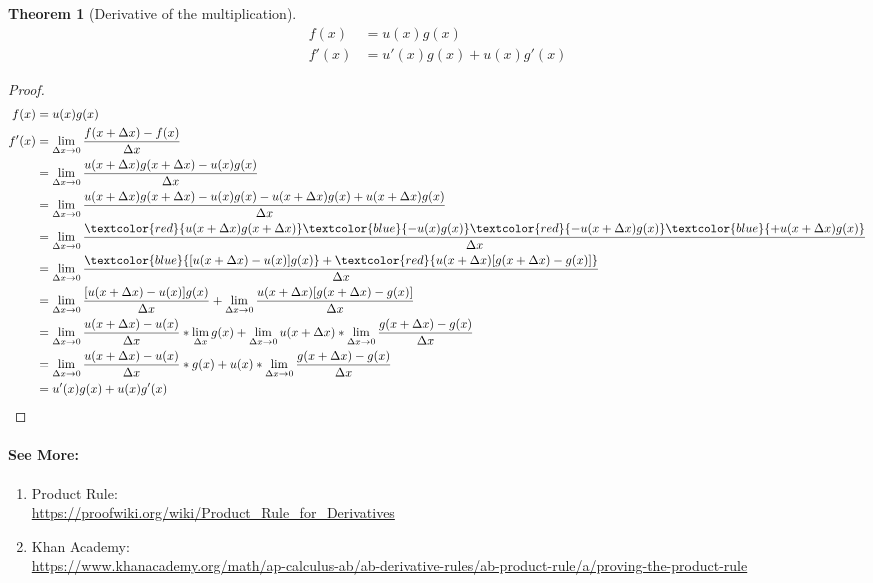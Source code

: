\documentclass{article}
\newtheorem{theorem}{Theorem}[section]
\theoremstyle{definition}
\begin{document}
\clearpage
\begin{theorem}[Derivative of the multiplication]\label{theorems:calculus:derivatives:multiplication}
	\begin{align*}
	f(x)&=u(x)g(x)\\
	f'(x)&=u'(x)g(x) + u(x)g'(x)
	\end{align*}
\end{theorem}
\begin{proof}
	\begin{align*}
	f(x) &= u(x)g(x) \\
	f'(x) &= \lim_{\Delta x \to 0} {\frac {f(x+\Delta x) - f(x)} {\Delta x}} \\
	&= \lim_{\Delta x \to 0} {\frac {u(x+\Delta x)g(x+\Delta x) - u(x)g(x)} {\Delta x}} \\
	&= \lim_{\Delta x \to 0} {\frac {u(x+\Delta x)g(x+\Delta x) - u(x)g(x) - u(x+\Delta x)g(x) + u(x+\Delta x)g(x) } {\Delta x}} \\
	&= \lim_{\Delta x \to 0} {\frac { \textcolor{red}{u(x+\Delta x)g(x+\Delta x)} \textcolor{blue}{- u(x)g(x)}  \textcolor{red}{- u(x+\Delta x)g(x)} \textcolor{blue}{+ u(x+\Delta x)g(x)} } {\Delta x}} \\
	&= \lim_{\Delta x \to 0} {\frac {\textcolor{blue}{[u(x+\Delta x) - u(x)]g(x)} + \textcolor{red}{ u(x+\Delta x)[g(x+\Delta x) - g(x)]}} {\Delta x}} \\
	&= \lim_{\Delta x \to 0} {\frac {[u(x+\Delta x) - u(x)]g(x)} {\Delta x}} + \lim_{\Delta x \to 0} {\frac {u(x+\Delta x)[g(x+\Delta x) - g(x)]} {\Delta x}} \\
	&= \lim_{\Delta x \to 0} {\frac {u(x+\Delta x) - u(x)} {\Delta x}} * \lim_{\Delta x} {g(x)} + \lim_{\Delta x \to 0} {u(x+\Delta x)} * \lim_{\Delta x \to 0} \frac{g(x+\Delta x) - g(x)} {\Delta x} \\
	&= \lim_{\Delta x \to 0} {\frac {u(x+\Delta x) - u(x)} {\Delta x}} * g(x) + u(x) * \lim_{\Delta x \to 0} {\frac {g(x+\Delta x) - g(x)} {\Delta x}} \\
	&= u'(x)g(x)+ u(x)g'(x) \\
	\end{align*}
\end{proof}
\paragraph{See More:}
\begin{enumerate}
	\item {Product Rule:\\
\url{https://proofwiki.org/wiki/Product_Rule_for_Derivatives}}
	\item {Khan Academy:\\
\url{https://www.khanacademy.org/math/ap-calculus-ab/ab-derivative-rules/ab-product-rule/a/proving-the-product-rule}}
\end{enumerate}
\end{document}
